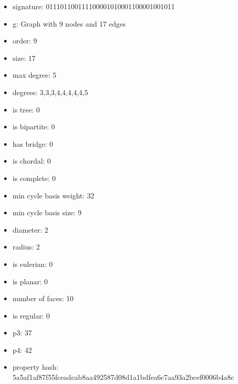 \newpage
\begin{figure}
\end{figure}
\begin{itemize}
\item signature: 011101100111100001010001100001001011
\item g: Graph with 9 nodes and 17 edges
\item order: 9
\item size: 17
\item max degree: 5
\item degrees: 3,3,3,4,4,4,4,4,5
\item is tree: 0
\item is bipartite: 0
\item has bridge: 0
\item is chordal: 0
\item is complete: 0
\item min cycle basis weight: 32
\item min cycle basis size: 9
\item diameter: 2
\item radius: 2
\item is eulerian: 0
\item is planar: 0
\item number of faces: 10
\item is regular: 0
\item p3: 37
\item p4: 42
\item property hash: 5a5af1af87f55fceadcab8aa492587d08d1a1bdfea6c7aa93a2bcef0006b4a8c
\end{itemize}
